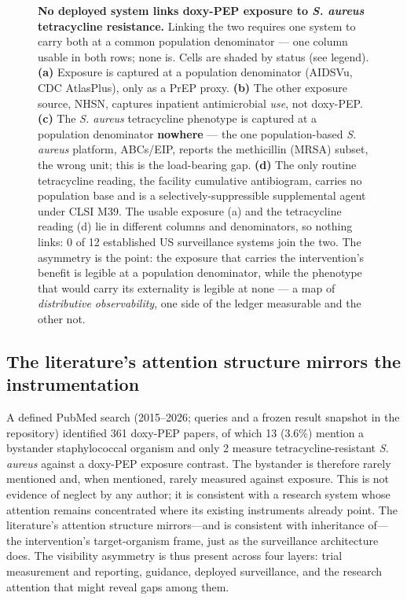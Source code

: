 \documentclass[10pt,letterpaper]{article}
\begin{document}
\begin{figure}[!h]
\caption{{\bf No deployed system links doxy-PEP exposure to \emph{S. aureus} tetracycline resistance.}
Linking the two requires one system to carry both at a common population denominator --- one column
usable in both rows; none is. Cells are shaded by status (see legend). \textbf{(a)} Exposure is
captured at a population denominator (AIDSVu, CDC AtlasPlus), only as a PrEP proxy. \textbf{(b)} The
other exposure source, NHSN, captures inpatient antimicrobial \emph{use}, not doxy-PEP. \textbf{(c)}
The \emph{S. aureus} tetracycline phenotype is captured at a population denominator \textbf{nowhere}
--- the one population-based \emph{S. aureus} platform, ABCs/EIP, reports the methicillin (MRSA)
subset, the wrong unit; this is the load-bearing gap. \textbf{(d)} The only routine tetracycline
reading, the facility cumulative antibiogram, carries no population base and is a
selectively-suppressible supplemental agent under CLSI M39. The usable exposure (a) and the
tetracycline reading (d) lie in different columns and denominators, so nothing links: 0 of 12
established US surveillance systems join the two. The asymmetry is the point: the exposure that carries
the intervention's benefit is legible at a population denominator, while the phenotype that would carry
its externality is legible at none --- a map of \emph{distributive observability}, one side of the
ledger measurable and the other not.}
\label{fig3}
\end{figure}

\subsection*{The literature's attention structure mirrors the instrumentation}

A defined PubMed search (2015--2026; queries and a frozen result
snapshot in the repository) identified 361 doxy-PEP papers, of which 13
(3.6\%) mention a bystander staphylococcal organism and only 2 measure
tetracycline-resistant \emph{S. aureus} against a doxy-PEP exposure contrast. The bystander
is therefore rarely mentioned and, when mentioned, rarely measured
against exposure. This is not evidence of neglect by any author; it is
consistent with a research system whose attention remains concentrated
where its existing instruments already point. The literature's attention
structure mirrors---and is consistent with inheritance of---the
intervention's target-organism frame, just as the surveillance
architecture does. The visibility asymmetry is thus present across four
layers: trial measurement and reporting, guidance, deployed surveillance,
and the research attention that might reveal gaps among them.
\end{document}
